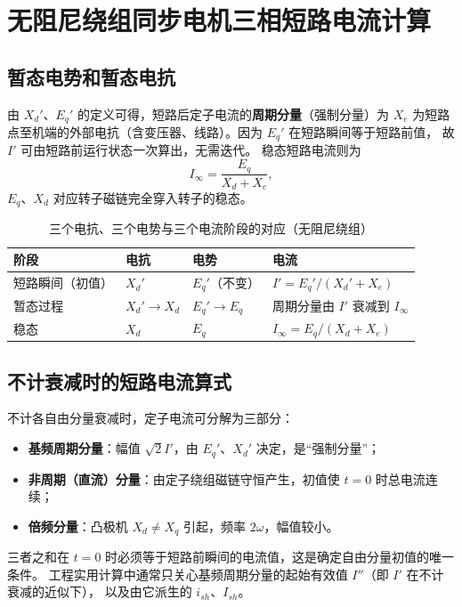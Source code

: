 \section{无阻尼绕组同步电机三相短路电流计算}

\subsection{暂态电势和暂态电抗}

由 $X_d'$、$E_q'$ 的定义可得，短路后定子电流的\textbf{周期分量}（强制分量）为
$X_e$ 为短路点至机端的外部电抗（含变压器、线路）。因为 $E_q'$ 在短路瞬间等于短路前值，
故 $I'$ 可由短路前运行状态一次算出，无需迭代。
稳态短路电流则为
\begin{equation}
  I_\infty=\frac{E_q}{X_d+X_e},
\end{equation}
$E_q$、$X_d$ 对应转子磁链完全穿入转子的稳态。

\begin{table}[htbp]
  \centering
  \caption{三个电抗、三个电势与三个电流阶段的对应（无阻尼绕组）}
  \small
  \begin{tabular}{@{}llll@{}}
    \toprule
    阶段 & 电抗 & 电势 & 电流 \\
    \midrule
    短路瞬间（初值） & $X_d'$ & $E_q'$（不变） & $I'=E_q'/(X_d'+X_e)$ \\
    暂态过程 & $X_d'\to X_d$ & $E_q'\to E_q$ & 周期分量由 $I'$ 衰减到 $I_\infty$ \\
    稳态 & $X_d$ & $E_q$ & $I_\infty=E_q/(X_d+X_e)$ \\
    \bottomrule
  \end{tabular}
\end{table}

\subsection{不计衰减时的短路电流算式}

不计各自由分量衰减时，定子电流可分解为三部分：
\begin{itemize}
  \item \textbf{基频周期分量}：幅值 $\sqrt{2}I'$，由 $E_q'$、$X_d'$ 决定，是“强制分量”；
  \item \textbf{非周期（直流）分量}：由定子绕组磁链守恒产生，初值使 $t=0$ 时总电流连续；
  \item \textbf{倍频分量}：凸极机 $X_d\ne X_q$ 引起，频率 $2\omega$，幅值较小。
\end{itemize}
三者之和在 $t=0$ 时必须等于短路前瞬间的电流值，这是确定自由分量初值的唯一条件。
工程实用计算中通常只关心基频周期分量的起始有效值 $I''$（即 $I'$ 在不计衰减的近似下），
以及由它派生的 $i_{sh}$、$I_{sh}$。

